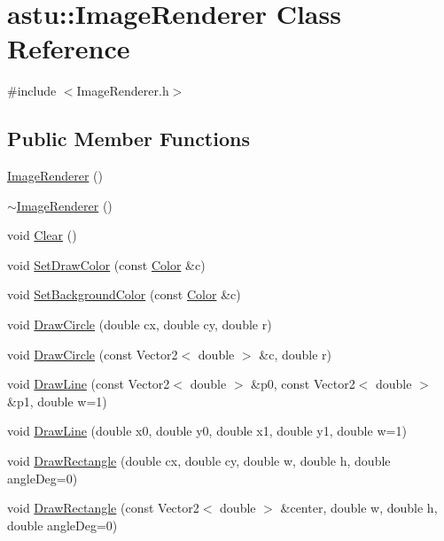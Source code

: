 \hypertarget{classastu_1_1ImageRenderer}{}\section{astu\+:\+:Image\+Renderer Class Reference}
\label{classastu_1_1ImageRenderer}


{\ttfamily \#include $<$Image\+Renderer.\+h$>$}

\subsection*{Public Member Functions}
\begin{DoxyCompactItemize}
\item 
\hyperlink{classastu_1_1ImageRenderer_a88dc5f8ff5aa6a039c1c77c31bd5bb89}{Image\+Renderer} ()
\item 
\hyperlink{classastu_1_1ImageRenderer_ac35d79e814253e2a2755da114e05d05c}{$\sim$\+Image\+Renderer} ()
\item 
void \hyperlink{classastu_1_1ImageRenderer_ae81b23f9e19254a7923cadf2a9e081a3}{Clear} ()
\item 
void \hyperlink{classastu_1_1ImageRenderer_a902cdac5634067b5e78de3f91667d1b9}{Set\+Draw\+Color} (const \hyperlink{classastu_1_1Color}{Color} \&c)
\item 
void \hyperlink{classastu_1_1ImageRenderer_acfb25962b67295325e9209759fcabe2b}{Set\+Background\+Color} (const \hyperlink{classastu_1_1Color}{Color} \&c)
\item 
void \hyperlink{classastu_1_1ImageRenderer_a903b1b78edee5f09b9ee1f604d762c28}{Draw\+Circle} (double cx, double cy, double r)
\item 
void \hyperlink{classastu_1_1ImageRenderer_a914047284fae6e8f58614018c8575f4e}{Draw\+Circle} (const Vector2$<$ double $>$ \&c, double r)
\item 
void \hyperlink{classastu_1_1ImageRenderer_a968b3ac1ef2611e149494d0855fbab85}{Draw\+Line} (const Vector2$<$ double $>$ \&p0, const Vector2$<$ double $>$ \&p1, double w=1)
\item 
void \hyperlink{classastu_1_1ImageRenderer_ae9e54c2f75cc76b9d45216df81b92aa4}{Draw\+Line} (double x0, double y0, double x1, double y1, double w=1)
\item 
void \hyperlink{classastu_1_1ImageRenderer_a95ed0bcec030e0ab17d0c6abc104eac3}{Draw\+Rectangle} (double cx, double cy, double w, double h, double angle\+Deg=0)
\item 
void \hyperlink{classastu_1_1ImageRenderer_a43f82202ac8ffdeba33fd5ecc600c267}{Draw\+Rectangle} (const Vector2$<$ double $>$ \&center, double w, double h, double angle\+Deg=0)

\end{DoxyCompactItemize}
